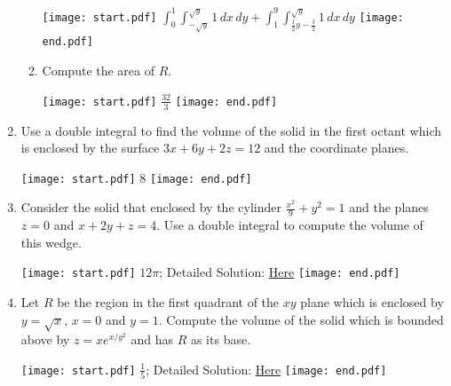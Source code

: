 \documentclass[12pt]{article}
\begin{document}
\begin{enumerate}
\begin{enumerate}
\texttt{[image: start.pdf]}
{{$\int_{0}^1 \int_{-\sqrt{y}}^{\sqrt{y}} 1 \,dx\,dy+\int_1^9 \int_{\frac{1}{2}y-\frac{3}{2}}^{\sqrt{y}} 1 \,dx\,dy$}}
\texttt{[image: end.pdf]}


\item Compute the area of $R$.

\texttt{[image: start.pdf]}
{{$\frac{32}{3}$}}
\texttt{[image: end.pdf]}


\end{enumerate}

\item Use a double integral to find the volume of the solid in the first octant which is enclosed by the surface $3x+6y+2z=12$ and the coordinate planes.

\texttt{[image: start.pdf]}
{{8}}
\texttt{[image: end.pdf]}


\item Consider the solid that enclosed by the cylinder $\frac{x^2}{9}+y^2=1$ and the planes $z=0$ and $x+2y+z=4$.  Use a double integral to compute the volume of this wedge.

\texttt{[image: start.pdf]}
{{$12\pi$; Detailed Solution: \textcolor{blue}{\href{http://www.math.drexel.edu/classes/Calculus/resources/Math200HW/Solutions/17_200_Double_Int_II_12.pdf}{Here}}}}
\texttt{[image: end.pdf]}


\item Let $R$ be the region in the first quadrant of the $xy$ plane which is enclosed by $y=\sqrt{x}$, $x=0$ and $y=1$.  Compute the volume of the solid which is bounded above by $z=xe^{x/y^2}$ and has $R$ as its base.

\texttt{[image: start.pdf]}
{{$\frac{1}{5}$; Detailed Solution: \textcolor{blue}{\href{http://www.math.drexel.edu/classes/Calculus/resources/Math200HW/Solutions/17_200_Double_Int_II_13.pdf}{Here}}}}
\texttt{[image: end.pdf]}


\end{enumerate}
\end{document}
